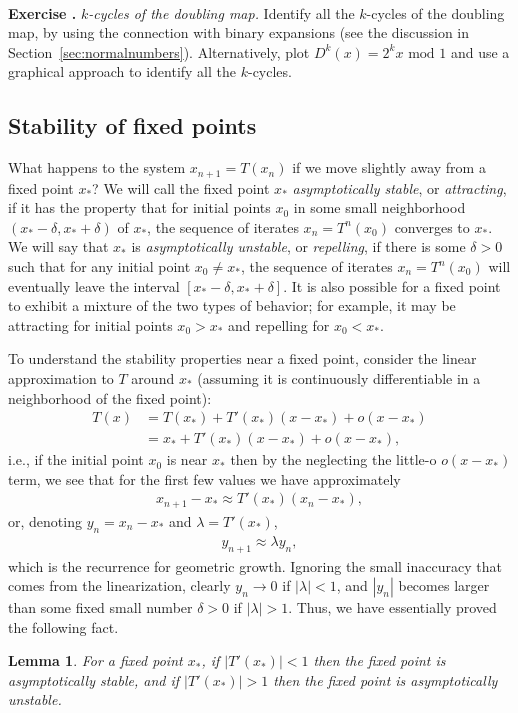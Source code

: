 \documentclass[12pt]{amsart}
\newcommand{\eqst}[1]{\begin{align*}#1\end{align*}}
\newtheorem{lem}[thm]{Lemma}
\newcounter{example}
\newcounter{exercise}
\newcommand{\beginexercise}[1]{\ \\ \addtocounter{exercise}{1} \textbf{Exercise \arabic{exercise}.} \textit{#1.}}
\begin{document}
\beginexercise{$k$-cycles of the doubling map} Identify all the $k$-cycles of the doubling map, by using the connection with binary expansions (see the discussion in Section~\ref{sec:normalnumbers}). Alternatively, plot $D^k(x)=2^k x \textrm{ mod }1$ and use a graphical approach to identify all the $k$-cycles.

\subsection{Stability of fixed points} What happens to the system $x_{n+1}=T(x_n)$ if we move slightly away from a fixed point $x_*$? We will call the fixed point $x_*$ \emph{asymptotically stable}, or \emph{attracting}, if it has the property that for initial points $x_0$ in some small neighborhood $(x_*-\delta, x_*+\delta)$ of $x_*$, the sequence of iterates $x_n = T^n(x_0)$ converges to $x_*$. We will say that $x_*$ is \emph{asymptotically unstable}, or \emph{repelling}, if there is some $\delta>0$ such that for any initial point $x_0\neq x_*$, the sequence of iterates $x_n=T^n(x_0)$ will eventually leave the interval $[x_*-\delta,x_*+\delta]$. It is also possible for a fixed point to exhibit a mixture of the two types of behavior; for example, it may be attracting for initial points $x_0>x_*$ and repelling for $x_0<x_*$.

To understand the stability properties near a fixed point, consider the linear approximation to $T$ around $x_*$ (assuming it is continuously differentiable in a neighborhood of the fixed point):
\eqst{ T(x) &= T(x_*) + T'(x_*) (x-x_*) + o(x-x_*) \\ &= x_* + T'(x_*) (x-x_*) + o(x-x_*), }
i.e., if the initial point $x_0$ is near $x_*$ then by the neglecting the little-o $o(x-x_*)$ term, we see that for the first few values we have approximately
\eqst{
x_{n+1} - x_* \approx T'(x_*) (x_n-x_*),
}
or, denoting $y_n = x_n-x_*$ and $\lambda=T'(x_*)$,
\eqst{
y_{n+1} \approx \lambda y_n,
}
which is the recurrence for geometric growth. Ignoring the small inaccuracy that comes from the linearization, clearly $y_n\to 0$ if $|\lambda|<1$, and $|y_n|$ becomes larger than some fixed small number $\delta>0$ if $|\lambda|>1$. Thus, we have essentially proved the following fact.

\begin{lem} \label{lem-fixedpoint-stability}
For a fixed point $x_*$, if $|T'(x_*)|<1$ then the fixed point is asymptotically stable, and if $|T'(x_*)|>1$ then the fixed point is asymptotically unstable.
\end{lem}
\end{document}
